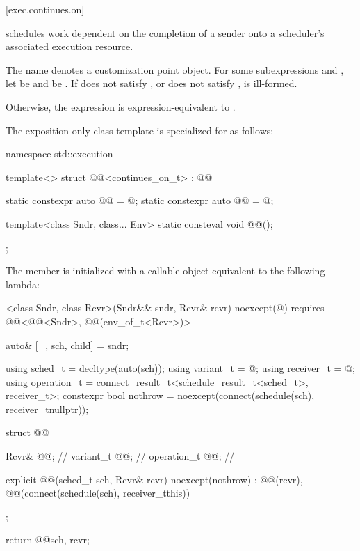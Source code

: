[exec.continues.on]{}

\pnum
{} schedules work dependent on the completion of a sender
onto a scheduler's associated execution resource.

\pnum
The name  denotes a customization point object.
For some subexpressions  and ,
let  be  and
 be .
If  does not satisfy , or
 does not satisfy ,
 is ill-formed.

\pnum
Otherwise,
the expression  is expression-equivalent to
.

\pnum
The exposition-only class template 
is specialized for  as follows:
%
\begin{codeblock}
namespace std::execution {
  template<>
  struct @@<continues_on_t> : @@ {
    static constexpr auto @@ = @\seebelow@;
    static constexpr auto @@ = @\seebelow@;

    template<class Sndr, class... Env>
      static consteval void @@();
  };
}
\end{codeblock}

\pnum
The member 
is initialized with a callable object equivalent to the following lambda:
\begin{codeblock}
[]<class Sndr, class Rcvr>(Sndr&& sndr, Rcvr& rcvr) noexcept(@\seebelow@)
    requires @@<@@<Sndr>, @@(env_of_t<Rcvr>)> {

  auto& [_, sch, child] = sndr;

  using sched_t = decltype(auto(sch));
  using variant_t = @\seebelow@;
  using receiver_t = @\seebelow@;
  using operation_t = connect_result_t<schedule_result_t<sched_t>, receiver_t>;
  constexpr bool nothrow = noexcept(connect(schedule(sch), receiver_t{nullptr}));

  struct @@ {
    Rcvr& @@;                 // \expos
    variant_t @@;     // \expos
    operation_t @@;       // \expos

    explicit @@(sched_t sch, Rcvr& rcvr) noexcept(nothrow)
      : @@(rcvr), @@(connect(schedule(sch), receiver_t{this})) {}
  };

  return @@{sch, rcvr};
}
\end{codeblock}

